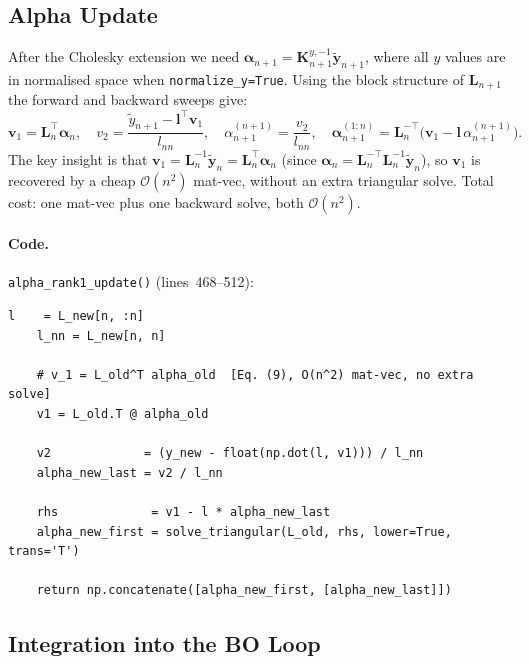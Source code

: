 \documentclass[11pt,a4paper]{article}
\newcommand{\by}{\bm{y}}
\newcommand{\bL}{\bm{L}}
\newcommand{\balpha}{\bm{\alpha}}
\theoremstyle{remark}
\newcommand{\coderange}[2]{lines~#1--#2}
\newcommand{\codefn}[1]{\texttt{#1()}}
\begin{document}
\subsection{Alpha Update}

After the Cholesky extension we need $\balpha_{n+1} = \bm{K}_{n+1}^{y,-1}\tilde{\by}_{n+1}$,
where all $y$ values are in normalised space when \texttt{normalize\_y=True}.
Using the block structure of $\bL_{n+1}$ the forward and backward sweeps give:
\begin{equation}
  \label{eq:alpha_update}
  \boxed{
  \bm{v}_1 = \bL_n^\top\balpha_n, \quad
  v_2 = \frac{\tilde{y}_{n+1}-\bm{l}^\top\bm{v}_1}{l_{nn}}, \quad
  \alpha_{n+1}^{(n+1)} = \frac{v_2}{l_{nn}}, \quad
  \balpha_{n+1}^{(1:n)} = \bL_n^{-\top}\!\bigl(\bm{v}_1-\bm{l}\,\alpha_{n+1}^{(n+1)}\bigr).
  }
\end{equation}
The key insight is that $\bm{v}_1 = \bL_n^{-1}\tilde{\by}_n = \bL_n^\top\balpha_n$
(since $\balpha_n = \bL_n^{-\top}\bL_n^{-1}\tilde{\by}_n$), so $\bm{v}_1$
is recovered by a cheap $\mathcal{O}(n^2)$ mat-vec, without an extra
triangular solve.  Total cost: one mat-vec plus one backward solve, both
$\mathcal{O}(n^2)$.

\paragraph{Code.} \codefn{alpha\_rank1\_update} (\coderange{468}{512}):

\begin{lstlisting}[firstnumber=497, caption=Alpha update in \codefn{alpha\_rank1\_update}]
    l    = L_new[n, :n]
    l_nn = L_new[n, n]

    # v_1 = L_old^T alpha_old  [Eq. (9), O(n^2) mat-vec, no extra solve]
    v1 = L_old.T @ alpha_old

    v2             = (y_new - float(np.dot(l, v1))) / l_nn
    alpha_new_last = v2 / l_nn

    rhs             = v1 - l * alpha_new_last
    alpha_new_first = solve_triangular(L_old, rhs, lower=True, trans='T')

    return np.concatenate([alpha_new_first, [alpha_new_last]])
\end{lstlisting}

\subsection{Integration into the BO Loop}
\end{document}

